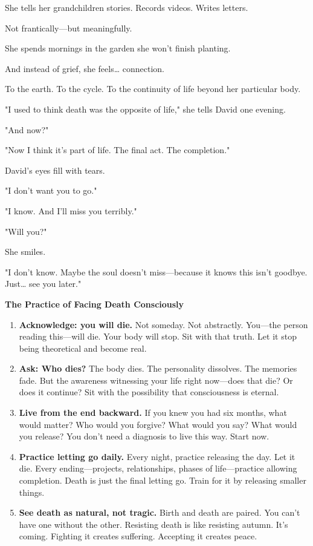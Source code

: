 \documentclass[11pt,twoside]{book}
\begin{document}
She tells her grandchildren stories. Records videos. Writes letters.

Not frantically—but meaningfully.

She spends mornings in the garden she won't finish planting.

And instead of grief, she feels\ldots{} connection.

To the earth. To the cycle. To the continuity of life beyond her particular body.

"I used to think death was the opposite of life," she tells David one evening.

"And now?"

"Now I think it's part of life. The final act. The completion."

David's eyes fill with tears.

"I don't want you to go."

"I know. And I'll miss you terribly."

"Will you?"

She smiles.

"I don't know. Maybe the soul doesn't miss—because it knows this isn't goodbye. Just\ldots{} see you later."

\begin{practicebox}
\textbf{The Practice of Facing Death Consciously}

\begin{enumerate}
\item \textbf{Acknowledge: you will die.} Not someday. Not abstractly. You—the person reading this—will die. Your body will stop. Sit with that truth. Let it stop being theoretical and become real.

\item \textbf{Ask: Who dies?} The body dies. The personality dissolves. The memories fade. But the awareness witnessing your life right now—does that die? Or does it continue? Sit with the possibility that consciousness is eternal.

\item \textbf{Live from the end backward.} If you knew you had six months, what would matter? Who would you forgive? What would you say? What would you release? You don't need a diagnosis to live this way. Start now.

\item \textbf{Practice letting go daily.} Every night, practice releasing the day. Let it die. Every ending—projects, relationships, phases of life—practice allowing completion. Death is just the final letting go. Train for it by releasing smaller things.

\item \textbf{See death as natural, not tragic.} Birth and death are paired. You can't have one without the other. Resisting death is like resisting autumn. It's coming. Fighting it creates suffering. Accepting it creates peace.
\end{enumerate}
\end{practicebox}
\end{document}
